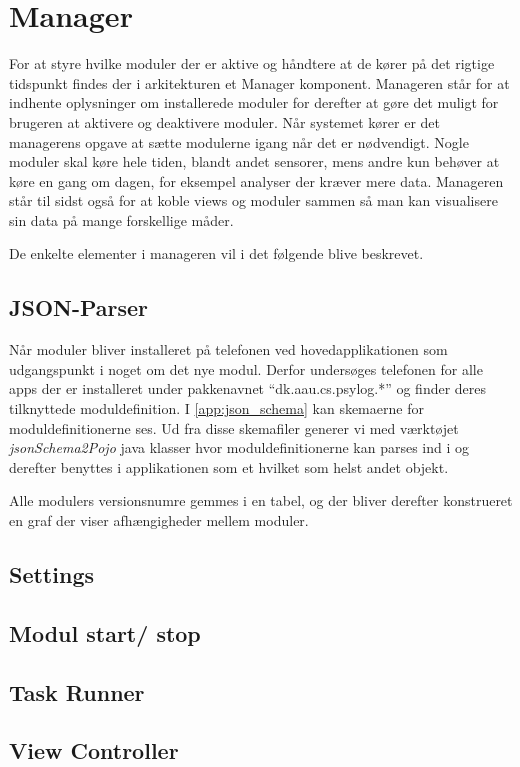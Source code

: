 \section{Manager}

For at styre hvilke moduler der er aktive og håndtere at de kører på det rigtige tidspunkt findes der i arkitekturen et Manager komponent.
Manageren står for at indhente oplysninger om installerede moduler for derefter at gøre det muligt for brugeren at aktivere og deaktivere moduler.
Når systemet kører er det managerens opgave at sætte modulerne igang når det er nødvendigt.
Nogle moduler skal køre hele tiden, blandt andet sensorer, mens andre kun behøver at køre en gang om dagen, for eksempel analyser der kræver mere data.
Manageren står til sidst også for at koble views og moduler sammen så man kan visualisere sin data på mange forskellige måder.

De enkelte elementer i manageren vil i det følgende blive beskrevet.

\subsection{JSON-Parser}

Når moduler bliver installeret på telefonen ved hovedapplikationen som udgangspunkt i noget om det nye modul.
Derfor undersøges telefonen for alle apps der er installeret under pakkenavnet ``dk.aau.cs.psylog.*'' og finder deres tilknyttede moduldefinition.
I \cref{app:json_schema} kan skemaerne for moduldefinitionerne ses.
Ud fra disse skemafiler generer vi med værktøjet \textit{jsonSchema2Pojo} \cite{jsonpojo} java klasser hvor moduldefinitionerne kan parses ind i og derefter benyttes i applikationen som et hvilket som helst andet objekt.


Alle modulers versionsnumre gemmes i en tabel, og der bliver derefter konstrueret en graf der viser afhængigheder mellem moduler.

\subsection{Settings}

\subsection{Modul start/ stop}

\subsection{Task Runner}

\subsection{View Controller}
